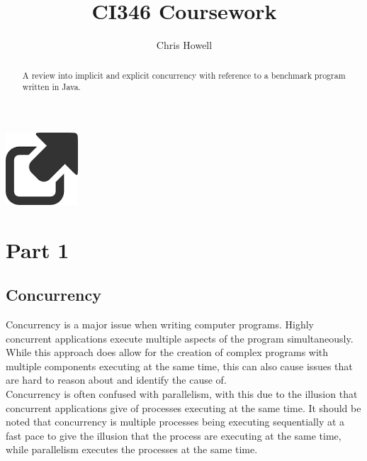 \documentclass[10pt]{article}  %
\title{CI346 Coursework}
\author{Chris Howell\\}
\theoremstyle{definition}
\theoremstyle{remark}
\begin{document}
\maketitle
 \begin{center}
  \includegraphics{link.png}
  \end{center}
\newpage                     %
\begin{abstract}

A review into implicit and explicit concurrency with reference to a benchmark program written in Java.



\end{abstract}

\newpage                     %
\tableofcontents

\newpage                     %
\section{Part 1}\label{s:intro}
%


 \begin{center}
  \end{center}

\subsection{Concurrency}\label{ss:back}



Concurrency is a major issue when writing computer programs. Highly concurrent applications execute multiple aspects of the program simultaneously. While this approach does allow for the creation of complex programs with multiple components executing at the same time, this can also cause issues that are hard to reason about and identify the cause of.\\

Concurrency is often confused with parallelism, with this due to the illusion that concurrent applications give of processes executing at the same time. It should be noted that concurrency is multiple processes being executing sequentially at a fast pace to give the illusion that the process are executing at the same time, while parallelism executes the processes at the same time.\\
\end{document}
